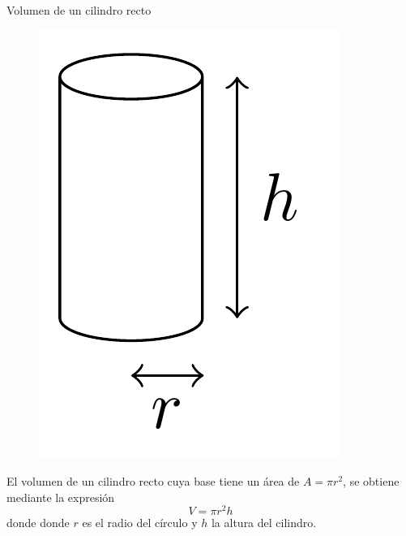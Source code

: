 
\begin{infocard}{Volumen de un cilindro recto}
   
   \begin{figure}
       \centering
       \includegraphics[width=\linewidth]{../images/LpV1W}
   \end{figure}

    El volumen de un cilindro recto cuya base tiene un área de $A=\pi r^2$, se obtiene mediante la expresión
    \[
        V = \pi r^2h
    \]
    donde donde $r$ es el radio del círculo y $h$ la altura del cilindro.
\end{infocard}



